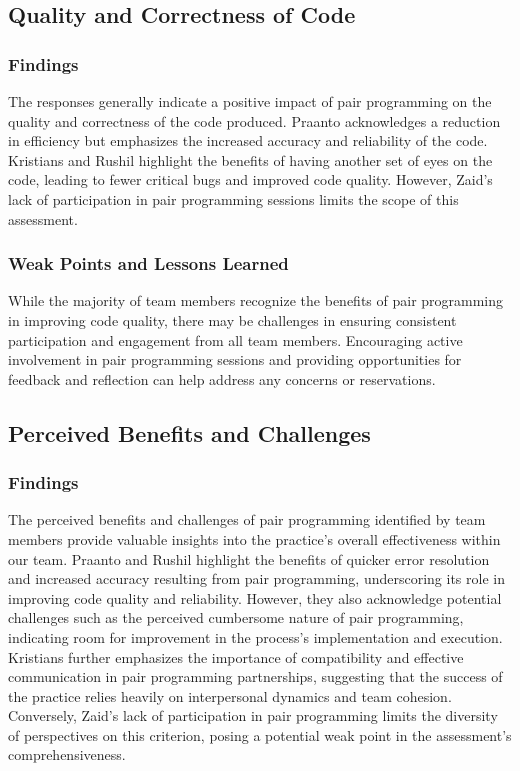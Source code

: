 \subsection{Quality and Correctness of Code}
\subsubsection{Findings} 
The responses generally indicate a positive impact of pair programming on the quality and correctness of the code produced. Praanto acknowledges a reduction in efficiency but emphasizes the increased accuracy and reliability of the code. Kristians and Rushil highlight the benefits of having another set of eyes on the code, leading to fewer critical bugs and improved code quality. However, Zaid's lack of participation in pair programming sessions limits the scope of this assessment.

\subsubsection{Weak Points and Lessons Learned} 
While the majority of team members recognize the benefits of pair programming in improving code quality, there may be challenges in ensuring consistent participation and engagement from all team members. Encouraging active involvement in pair programming sessions and providing opportunities for feedback and reflection can help address any concerns or reservations.

\subsection{Perceived Benefits and Challenges}
\subsubsection{Findings} 
The perceived benefits and challenges of pair programming identified by team members provide valuable insights into the practice's overall effectiveness within our team. Praanto and Rushil highlight the benefits of quicker error resolution and increased accuracy resulting from pair programming, underscoring its role in improving code quality and reliability. However, they also acknowledge potential challenges such as the perceived cumbersome nature of pair programming, indicating room for improvement in the process's implementation and execution. Kristians further emphasizes the importance of compatibility and effective communication in pair programming partnerships, suggesting that the success of the practice relies heavily on interpersonal dynamics and team cohesion. Conversely, Zaid's lack of participation in pair programming limits the diversity of perspectives on this criterion, posing a potential weak point in the assessment's comprehensiveness.

